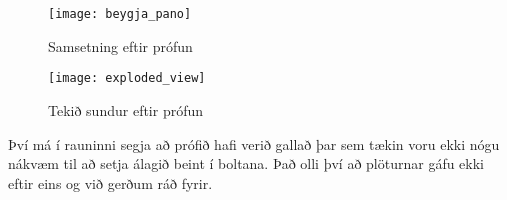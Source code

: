 \clearpage

\begin{figure}
  \centering
  \texttt{[image: beygja\_pano]}
  \caption{Samsetning eftir prófun}
  \label{fig:pano}
\end{figure}


\begin{figure}
  \centering
  \texttt{[image: exploded\_view]}
  \caption{Tekið sundur eftir prófun}
  \label{fig:exploded}
\end{figure}

Því má í rauninni segja að prófið hafi verið gallað þar sem tækin voru ekki nógu nákvæm til að setja álagið beint í boltana. Það olli því að plöturnar gáfu ekki eftir eins og við gerðum ráð fyrir.